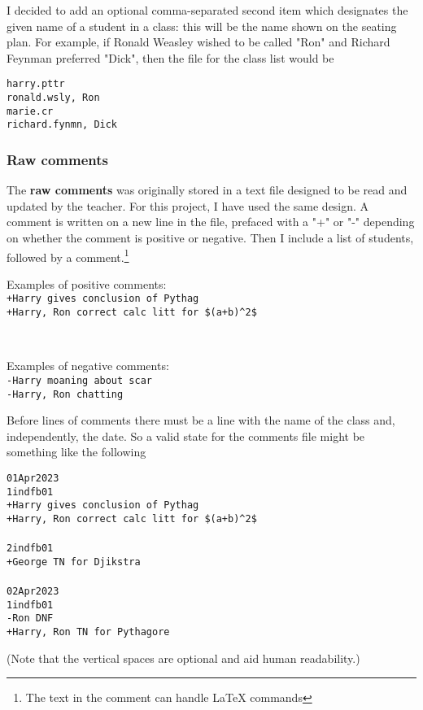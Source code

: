 \documentclass[10pt]{article}
\begin{document}
I decided to add an optional comma-separated second item which designates the given name of a student in a class: this will be the name shown on the seating plan. For example, if Ronald Weasley wished to be called "Ron" and Richard Feynman preferred "Dick", then the file for the class list would be 
\begin{tcolorbox}[title = 1in1dfb01.txt]
\texttt{harry.pttr\\ronald.wsly, Ron\\marie.cr\\richard.fynmn, Dick}
\end{tcolorbox}

\subsubsection{Raw comments}
The \textbf{raw comments} was originally stored in a text file designed to be read and updated by the teacher. For this project, I have used the same design. A comment is written on a new line in the file, prefaced with a "+" or "-" depending on whether the comment is positive or negative. Then I include a list of students, followed by a comment.\footnote{The text in the comment can handle \LaTeX{} commands}

Examples of positive comments: \\
\texttt{+Harry gives conclusion of Pythag} \\
\texttt{+Harry, Ron correct calc litt for \$(a+b)\textasciicircum2\$}

\

Examples of negative comments: \\
\texttt{-Harry moaning about scar} \\
\texttt{-Harry, Ron chatting}

Before lines of comments there must be a line with the name of the class and, independently, the date. So a valid state for the comments file might be something like the following
\begin{tcolorbox}[title = comments\_file\_v0.1.txt]
\texttt{01Apr2023\\1indfb01\\+Harry gives conclusion of Pythag\\+Harry, Ron correct calc litt for \$(a+b)\textasciicircum2\$\\\\2indfb01\\+George TN for Djikstra \\\\02Apr2023\\1indfb01\\-Ron DNF\\+Harry, Ron TN for Pythagore}
\end{tcolorbox}
(Note that the vertical spaces are optional and aid human readability.)
\end{document}
